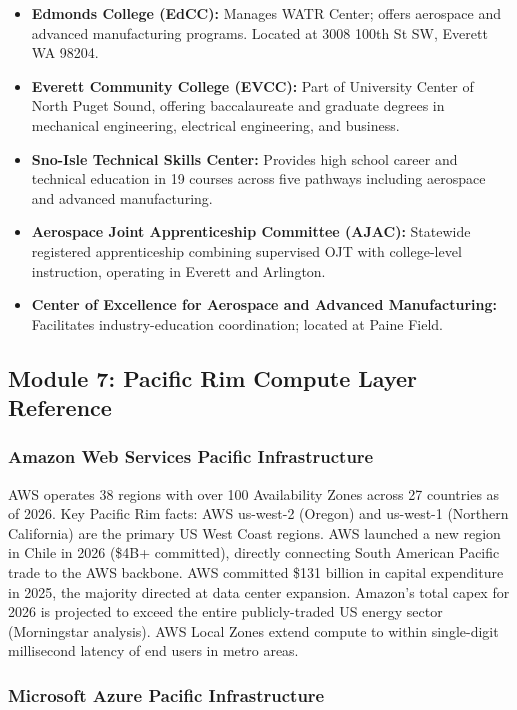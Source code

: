 \documentclass[11pt,letterpaper]{article}
\begin{document}
\begin{itemize}
  \item \textbf{Edmonds College (EdCC):} Manages WATR Center; offers aerospace and advanced manufacturing programs. Located at 3008 100th St SW, Everett WA 98204.
  \item \textbf{Everett Community College (EVCC):} Part of University Center of North Puget Sound, offering baccalaureate and graduate degrees in mechanical engineering, electrical engineering, and business.
  \item \textbf{Sno-Isle Technical Skills Center:} Provides high school career and technical education in 19 courses across five pathways including aerospace and advanced manufacturing.
  \item \textbf{Aerospace Joint Apprenticeship Committee (AJAC):} Statewide registered apprenticeship combining supervised OJT with college-level instruction, operating in Everett and Arlington.
  \item \textbf{Center of Excellence for Aerospace and Advanced Manufacturing:} Facilitates industry-education coordination; located at Paine Field.
\end{itemize}

\subsection{Module 7: Pacific Rim Compute Layer Reference}

\subsubsection{Amazon Web Services Pacific Infrastructure}

AWS operates 38 regions with over 100 Availability Zones across 27 countries as of 2026. Key Pacific Rim facts: AWS us-west-2 (Oregon) and us-west-1 (Northern California) are the primary US West Coast regions. AWS launched a new region in Chile in 2026 (\$4B+ committed), directly connecting South American Pacific trade to the AWS backbone. AWS committed \$131 billion in capital expenditure in 2025, the majority directed at data center expansion. Amazon's total capex for 2026 is projected to exceed the entire publicly-traded US energy sector (Morningstar analysis). AWS Local Zones extend compute to within single-digit millisecond latency of end users in metro areas.

\subsubsection{Microsoft Azure Pacific Infrastructure}
\end{document}
